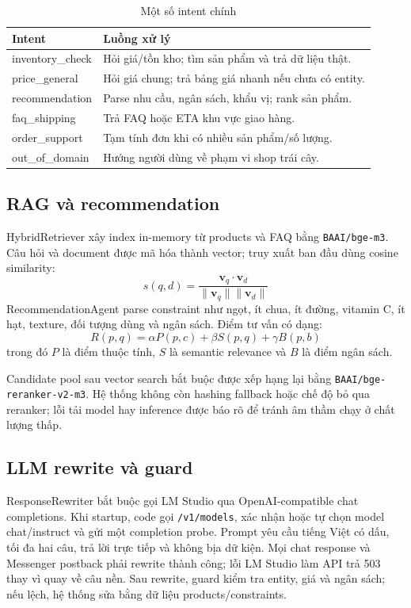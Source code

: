 \documentclass[10pt,a4paper,twocolumn]{article}
\begin{document}
\begin{table}[H]
\centering
\caption{Một số intent chính}
\label{tab:intents}
\scriptsize
\begin{tabularx}{\columnwidth}{@{}L{0.32\columnwidth}Y@{}}
\toprule
\textbf{Intent} & \textbf{Luồng xử lý} \\
\midrule
inventory\_check & Hỏi giá/tồn kho; tìm sản phẩm và trả dữ liệu thật. \\
price\_general & Hỏi giá chung; trả bảng giá nhanh nếu chưa có entity. \\
recommendation & Parse nhu cầu, ngân sách, khẩu vị; rank sản phẩm. \\
faq\_shipping & Trả FAQ hoặc ETA khu vực giao hàng. \\
order\_support & Tạm tính đơn khi có nhiều sản phẩm/số lượng. \\
out\_of\_domain & Hướng người dùng về phạm vi shop trái cây. \\
\bottomrule
\end{tabularx}
\end{table}

\subsection{RAG và recommendation}
HybridRetriever xây index in-memory từ products và FAQ bằng \texttt{BAAI/bge-m3}. Câu hỏi và document được mã hóa thành vector; truy xuất ban đầu dùng cosine similarity:
\begin{equation}
  s(q,d)=\frac{\mathbf{v}_q \cdot \mathbf{v}_d}{\|\mathbf{v}_q\|\|\mathbf{v}_d\|}
\end{equation}
RecommendationAgent parse constraint như ngọt, ít chua, ít đường, vitamin C, ít hạt, texture, đối tượng dùng và ngân sách. Điểm tư vấn có dạng:
\begin{equation}
  R(p,q)=\alpha P(p,c)+\beta S(p,q)+\gamma B(p,b)
\end{equation}
trong đó \(P\) là điểm thuộc tính, \(S\) là semantic relevance và \(B\) là điểm ngân sách.

Candidate pool sau vector search bắt buộc được xếp hạng lại bằng \texttt{BAAI/bge-reranker-v2-m3}. Hệ thống không còn hashing fallback hoặc chế độ bỏ qua reranker; lỗi tải model hay inference được báo rõ để tránh âm thầm chạy ở chất lượng thấp.

\subsection{LLM rewrite và guard}
ResponseRewriter bắt buộc gọi LM Studio qua OpenAI-compatible chat completions. Khi startup, code gọi \texttt{/v1/models}, xác nhận hoặc tự chọn model chat/instruct và gửi một completion probe. Prompt yêu cầu tiếng Việt có dấu, tối đa hai câu, trả lời trực tiếp và không bịa dữ kiện. Mọi chat response và Messenger postback phải rewrite thành công; lỗi LM Studio làm API trả 503 thay vì quay về câu nền. Sau rewrite, guard kiểm tra entity, giá và ngân sách; nếu lệch, hệ thống sửa bằng dữ liệu products/constraints.
\end{document}
